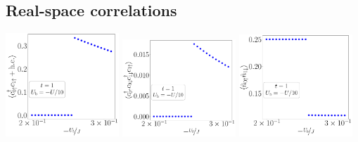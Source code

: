 \subsection*{Real-space correlations}
\begin{center}
	\includegraphics[width=0.32\textwidth]{../figures/r1p-D=1000.00000,t=1.00000,J=30.00000,V=1.50000J,Ub=-Uby10,N=4,U=59.85787,93.55363,25.pdf}
	\includegraphics[width=0.32\textwidth]{../figures/r-od-D=1000.00000,t=1.00000,J=30.00000,V=1.50000J,Ub=-Uby10,N=4,U=59.85787,93.55363,25.pdf}
	\includegraphics[width=0.32\textwidth]{../figures/r-opp-D=1000.00000,t=1.00000,J=30.00000,V=1.50000J,Ub=-Uby10,N=4,U=59.85787,93.55363,25.pdf}


\end{center}
